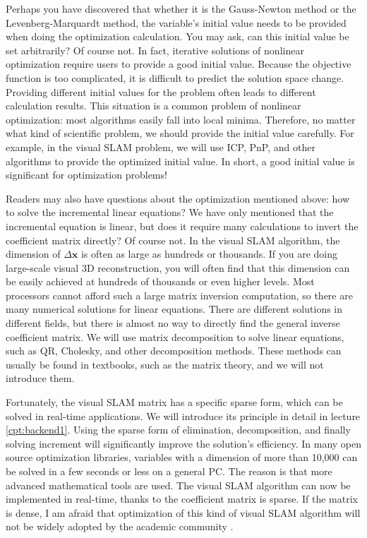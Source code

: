 Perhaps you have discovered that whether it is the Gauss-Newton method or the Levenberg-Marquardt method, the variable's initial value needs to be provided when doing the optimization calculation. You may ask, can this initial value be set arbitrarily? Of course not. In fact, iterative solutions of nonlinear optimization require users to provide a good initial value. Because the objective function is too complicated, it is difficult to predict the solution space change. Providing different initial values ​​for the problem often leads to different calculation results. This situation is a common problem of nonlinear optimization: most algorithms easily fall into local minima. Therefore, no matter what kind of scientific problem, we should provide the initial value carefully. For example, in the visual SLAM problem, we will use ICP, PnP, and other algorithms to provide the optimized initial value. In short, a good initial value is significant for optimization problems!

Readers may also have questions about the optimization mentioned above: how to solve the incremental linear equations? We have only mentioned that the incremental equation is linear, but does it require many calculations to invert the coefficient matrix directly? Of course not. In the visual SLAM algorithm, the dimension of $\Delta \mathbf{x}$ is often as large as hundreds or thousands. If you are doing large-scale visual 3D reconstruction, you will often find that this dimension can be easily achieved at hundreds of thousands or even higher levels. Most processors cannot afford such a large matrix inversion computation, so there are many numerical solutions for linear equations. There are different solutions in different fields, but there is almost no way to directly find the general inverse coefficient matrix. We will use matrix decomposition to solve linear equations, such as QR, Cholesky, and other decomposition methods. These methods can usually be found in textbooks, such as the matrix theory, and we will not introduce them.

Fortunately, the visual SLAM matrix has a specific sparse form, which can be solved in real-time applications. We will introduce its principle in detail in lecture \ref{cpt:backend1}. Using the sparse form of elimination, decomposition, and finally solving increment will significantly improve the solution's efficiency. In many open source optimization libraries, variables with a dimension of more than 10,000 can be solved in a few seconds or less on a general PC. The reason is that more advanced mathematical tools are used. The visual SLAM algorithm can now be implemented in real-time, thanks to the coefficient matrix is ​​sparse. If the matrix is ​​dense, I am afraid that optimization of this kind of visual SLAM algorithm will not be widely adopted by the academic community \cite{Lourakis2009, Sibley2009a, Triggs2000}.

